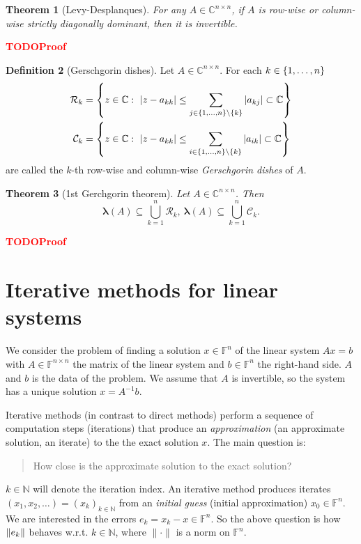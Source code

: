 \documentclass[12pt]{article}
\newcounter{lecture}
\newtheorem{theorem}{Theorem}[lecture]
\theoremstyle{definition}
\newtheorem{definition}[theorem]{Definition}
\theoremstyle{remark}
\numberwithin{equation}{section}
\newcommand{\F}{\mathbb{F}}
\newcommand{\C}{\mathbb{C}}
\newcommand{\N}{\mathbb{N}}
\newcommand{\normempty}{\|\cdot\|}
\newcommand{\spectrum}[1]{\bm{\lambda}(#1)}
\newcommand{\TODO}[1][]{\textcolor{red}{\textbf{TODO\ifblank{#1}{}{:\ }#1} }}
\DeclarePairedDelimiter{\norm}{\lVert}{\rVert}
\DeclarePairedDelimiter{\set}{\{}{\}}
\begin{document}
\begin{theorem}[Levy-Desplanques]
  For any $A \in \C^{n \times n}$, if $A$ is row-wise or column-wise strictly diagonally dominant, then it is invertible.
\end{theorem}
\TODO[Proof]

\begin{definition}[Gerschgorin dishes]
  Let $A \in \C^{n \times n}$. For each $k \in \set{1,\ldots, n}$
  \begin{align*}
    \mathcal{R}_k &= \set*{z \in \C:\ |z-a_{kk}| \leq \sum_{j \in \set{1,\ldots,n} \setminus \set{k}} |a_{kj}|\subset \C} \\
    \mathcal{C}_k &= \set*{z \in \C:\ |z-a_{kk}| \leq \sum_{i \in \set{1,\ldots,n} \setminus \set{k}} |a_{ik}|\subset \C}
  \end{align*}
  are called the $k$-th row-wise and column-wise \emph{Gerschgorin dishes} of $A$.
\end{definition}

\begin{theorem}[1st Gerchgorin theorem]
  Let $A \in \C^{n \times n}$. Then
  \begin{equation*}
    \spectrum{A} \subseteq \bigcup_{k=1}^n \mathcal{R}_k,\ \spectrum{A}\subseteq\bigcup_{k=1}^n \mathcal{C}_k.
  \end{equation*}
\end{theorem}
\TODO[Proof]

\section{Iterative methods for linear systems}
We consider the problem of finding a solution $x \in \F^n$ of the linear system $Ax = b$ with $A \in \F^{n \times n}$ the matrix of the linear system and $b \in \F^n$ the right-hand side. $A$ and $b$ is the data of the problem. We assume that $A$ is invertible, so the system has a unique solution $x = A^{-1}b$.

Iterative methods (in contrast to direct methods) perform a sequence of computation steps (iterations) that produce an \emph{approximation} (an approximate solution, an iterate) to the the exact solution $x$. The main question is:
\begin{quote}
  How close is the approximate solution to the exact solution?
\end{quote}

$k \in \N$ will denote the iteration index. An iterative method produces iterates $(x_1,x_2,\ldots) = (x_k)_{k \in \N}$ from an \emph{initial guess} (initial approximation) $x_0 \in \F^n$. We are interested in the errors $e_k = x_k - x \in \F^n$. So the above question is how $\norm{e_k}$ behaves w.r.t. $k\in \N$, where $\normempty$ is a norm on $\F^n$.
\end{document}
